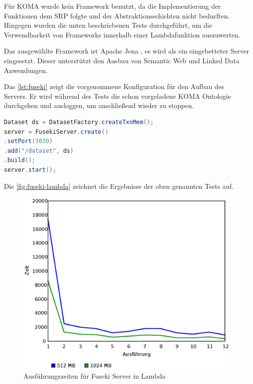 \documentclass[
12pt,
english,
ngerman,
headsepline,
twoside,
openright,
numbers=noenddot,version=first
]{scrreprt}
\begin{document}
Für \acrshort{KOMA} wurde kein Framework benutzt, da die Implementierung der Funktionen dem \acrshort{SRP} folgte und der Abstraktionsschichten nicht bedurften. Hingegen wurden die unten beschriebenen Tests durchgeführt, um die Verwendbarkeit von Frameworks innerhalb einer Lambdafunktion auszuwerten. 

Das ausgewählte Framework ist Apache Jena \cite{fuseki}, es wird als ein eingebetteter Server eingesetzt. Dieser unterstützt den Ausbau von Semantic Web und Linked Data Anwendungen.

Das \autoref{lst:fuseki} zeigt die vorgenommene Konfiguration für den Aufbau des Servers. Er wird während des Tests die schon vorgeladene \acrshort{KOMA} Ontologie durchgehen und ausloggen, um anschließend wieder zu stoppen.

\begin{lstlisting}[language=Java,caption={Embedded Server in Lambda},label={lst:fuseki}]
Dataset ds = DatasetFactory.createTxnMem();
server = FusekiServer.create()
.setPort(3030)
.add("/dataset", ds)
.build();
server.start();

\end{lstlisting}

Die \autoref{fig:fuseki-lambda} zeichnet die Ergebnisse der oben genannten Tests auf. 

\begin{figure}[h]
	\centering{}
	\includegraphics[scale=0.60]{./pics/cold-fuseky.eps}
	\caption{Ausführungszeiten für Fuseki Server in Lambda }
	\label{fig:fuseki-lambda}
\end{figure}
\end{document}
